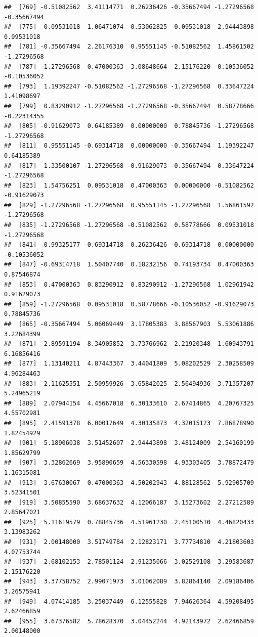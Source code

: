 \documentclass[
]{article}
\begin{document}
\begin{verbatim}
##  [769] -0.51082562  3.41114771  0.26236426 -0.35667494 -1.27296568 -0.35667494
##  [775]  0.09531018  1.06471074  0.53062825  0.09531018  2.94443898  0.09531018
##  [781] -0.35667494  2.26176310  0.95551145 -0.51082562  1.45861502 -1.27296568
##  [787] -1.27296568  0.47000363  3.08648664  2.15176220 -0.10536052 -0.10536052
##  [793]  1.19392247 -0.51082562 -1.27296568 -1.27296568  0.33647224  1.41098697
##  [799]  0.83290912 -1.27296568 -1.27296568 -0.35667494  0.58778666 -0.22314355
##  [805] -0.91629073  0.64185389  0.00000000  0.78845736 -1.27296568 -1.27296568
##  [811]  0.95551145 -0.69314718  0.00000000 -0.35667494  1.19392247  0.64185389
##  [817]  1.33500107 -1.27296568 -0.91629073 -0.35667494  0.33647224 -1.27296568
##  [823]  1.54756251  0.09531018  0.47000363  0.00000000 -0.51082562 -0.91629073
##  [829] -1.27296568 -1.27296568  0.95551145 -1.27296568  1.56861592 -1.27296568
##  [835] -1.27296568 -1.27296568 -0.51082562  0.58778666  0.09531018 -1.27296568
##  [841]  0.99325177 -0.69314718  0.26236426 -0.69314718  0.00000000 -0.10536052
##  [847] -0.69314718  1.50407740  0.18232156  0.74193734  0.47000363  0.87546874
##  [853]  0.47000363  0.83290912  0.83290912 -1.27296568  1.02961942  0.91629073
##  [859] -1.27296568  0.09531018  0.58778666 -0.10536052 -0.91629073  0.78845736
##  [865] -0.35667494  5.06069449  3.17805383  3.88567903  5.53061886  3.22684399
##  [871]  2.89591194  8.34905852  3.73766962  2.21920348  1.60943791  6.16856416
##  [877]  1.13140211  4.87443367  3.44041809  5.08202529  2.30258509  4.96284463
##  [883]  2.11625551  2.50959926  3.65842025  2.56494936  3.71357207  5.24965219
##  [889]  2.07944154  4.45667018  6.30133610  2.67414865  4.20767325  4.55702981
##  [895]  2.41591378  6.00017649  4.30135873  4.32015123  7.86878990  1.82454929
##  [901]  5.18906038  3.51452607  2.94443898  3.48124009  2.54160199  1.85629799
##  [907]  3.32862669  3.95890659  4.56330598  4.93303405  3.78872479  1.16315081
##  [913]  3.67630067  0.47000363  4.50202943  4.88128562  5.92905709  3.52341501
##  [919]  3.50855590  3.68637632  4.12066187  3.15273602  2.27212589  2.85647021
##  [925]  5.11619579  0.78845736  4.51961230  2.45100510  4.46820433  3.13983262
##  [931]  2.00148000  3.51749784  2.12823171  3.77734810  4.21803603  4.07753744
##  [937]  2.68102153  2.78501124  2.91235066  3.02529108  3.29583687  2.15176220
##  [943]  3.37758752  2.99071973  3.01062089  3.82864140  2.09186406  3.26575941
##  [949]  4.07414185  3.25037449  6.12555828  7.94626364  4.59208495  2.62466859
##  [955]  3.67376582  5.78628370  3.04452244  4.92143972  2.62466859  2.00148000

\end{verbatim}
\end{document}
